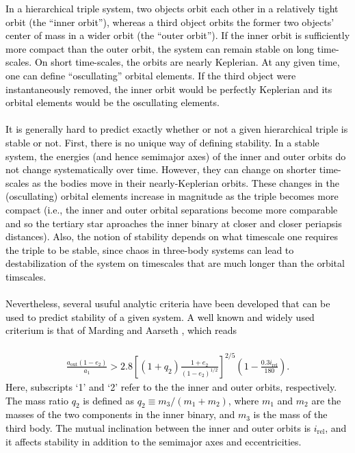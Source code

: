 \documentclass[main.tex]{subfiles}
\begin{document}
\begin{tcolorbox}[sharp corners, colback=blue!30, colframe=blue!80!blue,  title=Box \refstepcounter{educhap3}\label{boxchap3:stab}\ref{boxchap3:stab} -- Stability of hierarchical triples]
\par \textcolor{black}{ In a hierarchical triple system, two objects orbit each other in a relatively tight orbit (the ``inner orbit''), whereas a third object orbits the former two objects' center of mass in a wider orbit (the ``outer orbit''). If the inner orbit is sufficiently more compact than the outer orbit, the system can remain stable on long time-scales. On short time-scales, the orbits are nearly Keplerian. At any given time, one can define ``oscullating'' orbital elements. If the third object were instantaneously removed, the inner orbit would be perfectly Keplerian and its orbital elements would be the oscullating elements. \\ \\
It is generally hard to predict exactly whether or not a given hierarchical triple is stable or not. First, there is no unique way of defining stability. In a stable system, the energies (and hence semimajor axes) of the inner and outer orbits do not change systematically over time. However, they can change on shorter time-scales as the bodies move in their nearly-Keplerian orbits. These changes in the (oscullating) orbital elements increase in magnitude as the triple becomes more compact (i.e., the inner and outer orbital separations become more comparable and so the tertiary star aproaches the inner binary at closer and closer periapsis distances).  Also, the notion of stability depends on what timescale one requires the triple to be stable, since chaos in three-body systems can lead to destabilization of the system on timescales that are much longer than the orbital timscales. \\ \\
Nevertheless, several usuful analytic criteria have been developed that can be used to predict stability of a given system. A well known and widely used criterium is that of Marding and Aarseth \citep{}, which reads \\ \\
\begin{align}
\frac{a_{\mathrm{out}}(1-e_2)}{a_1} > 2.8 \left [ (1 + q_2) \frac{1+e_2}{(1 - e_2)^{1/2}} \right ]^{2/5} \left (1 - \frac{0.3 i_{\mathrm{rel}}}{180} \right ).
\end{align}
Here, subscripts `1' and `2' refer to the the inner and outer orbits, respectively. The mass ratio $q_2$ is defined as $q_2 \equiv m_3/(m_1+m_2)$, where $m_1$ and $m_2$ are the masses of the two components in the inner binary, and $m_3$ is the mass of the third body. The mutual inclination between the inner and outer orbits is $i_{\mathrm{rel}}$, and it affects stability in addition to the semimajor axes and eccentricities.
}
\end{tcolorbox}
\end{document}
